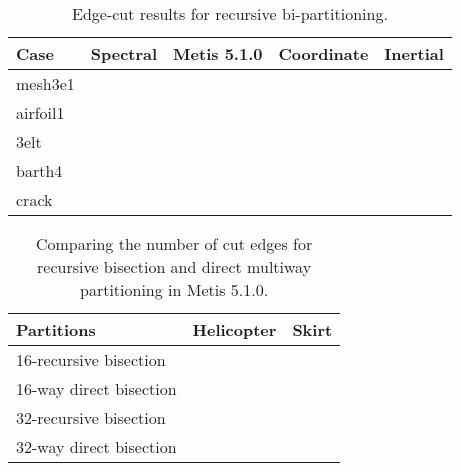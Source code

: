\documentclass[unicode,11pt,a4paper,oneside,numbers=endperiod,openany]{scrartcl}
\begin{document}
\begin{table}[h]
\caption{Edge-cut results for recursive bi-partitioning.}
\centering
\begin{tabular}{l|r|r|r|r} \hline\hline 
 Case            &  Spectral             &  Metis 5.1.0    & Coordinate & Inertial  \\ \hline
 mesh3e1         &                       &                 &            &           \\             
 airfoil1        &                       &                 &            &           \\ 
 3elt            &                       &                 &            &           \\ 
 barth4          &                       &                 &            &           \\ 
 crack           &                       &                 &            &           \\ \hline \hline
\end{tabular}
\label{table:Rec_bisection}
\end{table}


\begin{table}[h]
\caption{Comparing the number of cut edges for recursive bisection and direct multiway partitioning in Metis 5.1.0.}
\centering
\begin{tabular}{l|r|r} \hline\hline 
Partitions       &   Helicopter           & Skirt  \\ \hline
 16-recursive bisection           &                       &            \\
 16-way direct bisection           &                       &            \\
 32-recursive bisection           &                       &            \\
 32-way direct bisection           &                       &            \\ \hline \hline
\end{tabular}              
\label{table:Compare_Metis}
\end{table}
\end{document}
